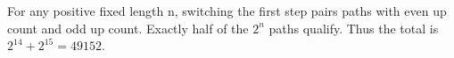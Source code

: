 For any positive fixed length n, switching the first step pairs paths with even up count and odd up count. Exactly half of the $2^n$ paths qualify. Thus the total is $2^{14}+2^{15}=\boxed{49152}$.
